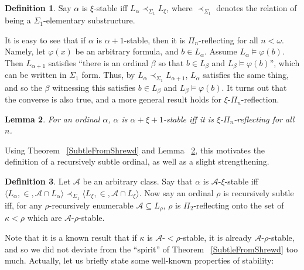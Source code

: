 \documentclass{article}
\theoremstyle{definition}
\newtheorem{definition}{Definition}[section]
\theoremstyle{plain}
\theoremstyle{plain}
\theoremstyle{plain}
\theoremstyle{plain}
\theoremstyle{remark}
\theoremstyle{remark}
\theoremstyle{remark}
\theoremstyle{plain}
\newtheorem{lemma}[definition]{Lemma}
\theoremstyle{plain}
\theoremstyle{plain}
\begin{document}
\begin{definition}
\label{StableOrdinal}
Say $\alpha$ is $\xi$-stable iff $L_\alpha \prec_{\Sigma_1} L_\xi$, where $\prec_{\Sigma_1}$ denotes the relation of being a $\Sigma_1$-elementary substructure.
\end{definition}

It is easy to see that if $\alpha$ is $\alpha+1$-stable, then it is $\Pi_n$-reflecting for all $n < \omega$. Namely, let $\varphi(x)$ be an arbitrary formula, and $b \in L_\alpha$. Assume $L_\alpha \models \varphi(b)$. Then $L_{\alpha+1}$ satisfies ``there is an ordinal $\beta$ so that $b \in L_\beta$ and $L_\beta \models \varphi(b)$'', which can be written in $\Sigma_1$ form. Thus, by $L_\alpha \prec_{\Sigma_1} L_{\alpha+1}$, $L_\alpha$ satisfies the same thing, and so the $\beta$ witnessing this satisfies $b \in L_\beta$ and $L_\beta \models \varphi(b)$. It turns out that the converse is also true, and a more general result holds for $\xi$-$\Pi_n$-reflection.

\begin{lemma}
\label{StableVersusReflecting}
For an ordinal $\alpha$, $\alpha$ is $\alpha+\xi+1$-stable iff it is $\xi$-$\Pi_n$-reflecting for all $n$.
\end{lemma}

Using Theorem ~\ref{SubtleFromShrewd} and Lemma ~\ref{StableVersusReflecting}, this motivates the definition of a recursively subtle ordinal, as well as a slight strengthening.

\begin{definition}
Let $\mathcal{A}$ be an arbitrary class. Say that $\alpha$ is $\mathcal{A}$-$\xi$-stable iff $\langle L_\alpha, \in, \mathcal{A} \cap L_\alpha \rangle \prec_{\Sigma_1} \langle L_\xi, \in, \mathcal{A} \cap L_\xi \rangle$. Now say an ordinal $\rho$ is recursively subtle iff, for any $\rho$-recursively enumerable $\mathcal{A} \subseteq L_\rho$, $\rho$ is $\Pi_2$-reflecting onto the set of $\kappa < \rho$ which are $\mathcal{A}$-$\rho$-stable.
\end{definition}

Note that it is a known result that if $\kappa$ is $\mathcal{A}$-$< \rho$-stable, it is already $\mathcal{A}$-$\rho$-stable, and so we did not deviate from the ``spirit'' of Theorem ~\ref{SubtleFromShrewd} too much. Actually, let us briefly state some well-known properties of stability:
\end{document}
